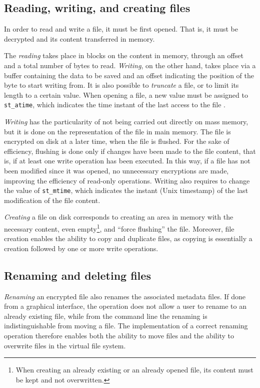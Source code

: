 \documentclass[a4paper,12pt,twoside,openright]{report}
\begin{document}
  \subsection{Reading, writing, and creating files}

  In order to read and write a file, it must be first opened. That is, it must be decrypted and its content transferred in memory.

  The \textit{reading} takes place in blocks on the content in memory, through an offset and a total
  number of bytes to read.
  \textit{Writing}, on the other hand, takes place via a buffer containing the data to be saved and an offset indicating
  the position of the byte to start writing from.
  It is also possible to \textit{truncate} a file, or to limit its length to a certain value.
  When opening a file, a new value must be assigned to \texttt{st\_atime}, which indicates the time instant
  of the last access to the file \cite{linuxmanstat}.

  \textit{Writing} has the particularity of not being carried out directly on mass memory, but it is done on the
  representation of the file in main memory. The file is encrypted on disk at a later time, when the file is
  flushed. For the sake of efficiency, flushing is done only if changes have been made to the file content,
  that is, if at least one write operation has been executed.
  In this way, if a file has not been modified since it was opened, no unnecessary encryptions are made,
  improving the efficiency of read-only operations.
  Writing also requires to change the value of \texttt{st\_mtime}, which indicates the instant (Unix timestamp)
  of the last modification \cite{linuxmanstat} of the file content.

  \textit{Creating} a file on disk corresponds to creating an area in memory with the necessary content,
  even empty\footnote{When creating an already existing or an already opened file, its content must be
  kept and not overwritten.}, and ``force flushing'' the file.
  Moreover, file creation enables the ability to copy and duplicate files, as copying is essentially a creation
  followed by one or more write operations.

  \subsection{Renaming and deleting files}

  \textit{Renaming} an encrypted file also renames the associated metadata files.
  If done from a graphical interface, the operation does not allow a user to rename to an already
  existing file, while from the command line the renaming is indistinguishable from moving a file.
  The implementation of a correct renaming operation therefore enables both the ability to move
  files and the ability to overwrite files in the virtual file system.
\end{document}
